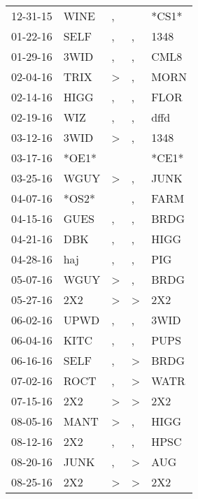 \begin{supertabular}{lllll}
 12-31-15 &   WINE &                , &                  &  *CS1* \\
 01-22-16 &   SELF &                , &                , &   1348 \\
 01-29-16 &   3WID &                , &                , &   CML8 \\
 02-04-16 &   TRIX &     \textgreater &                , &   MORN \\
 02-14-16 &   HIGG &                , &                , &   FLOR \\
 02-19-16 &    WIZ &                , &                , &   dffd \\
 03-12-16 &   3WID &     \textgreater &                , &   1348 \\
 03-17-16 &  *OE1* &                  &                  &  *CE1* \\
 03-25-16 &   WGUY &     \textgreater &                , &   JUNK \\
 04-07-16 &  *OS2* &                  &                , &   FARM \\
 04-15-16 &   GUES &                , &                , &   BRDG \\
 04-21-16 &    DBK &                , &                , &   HIGG \\
 04-28-16 &    haj &                , &                , &    PIG \\
 05-07-16 &   WGUY &     \textgreater &                , &   BRDG \\
 05-27-16 &    2X2 &     \textgreater &     \textgreater &    2X2 \\
 06-02-16 &   UPWD &                , &                , &   3WID \\
 06-04-16 &   KITC &                , &                , &   PUPS \\
 06-16-16 &   SELF &                , &     \textgreater &   BRDG \\
 07-02-16 &   ROCT &                , &     \textgreater &   WATR \\
 07-15-16 &    2X2 &     \textgreater &     \textgreater &    2X2 \\
 08-05-16 &   MANT &     \textgreater &                , &   HIGG \\
 08-12-16 &    2X2 &                , &                , &   HPSC \\
 08-20-16 &   JUNK &                , &     \textgreater &    AUG \\
 08-25-16 &    2X2 &     \textgreater &     \textgreater &    2X2 \\

\end{supertabular}
